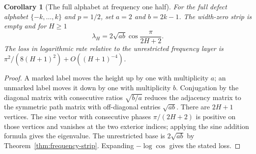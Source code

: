 \documentclass[11pt]{article}
\newtheorem{corollary}[theorem]{Corollary}
\theoremstyle{definition}
\theoremstyle{remark}
\begin{document}
\begin{corollary}[The full alphabet at frequency one half]\label{cor:half-strip}
For the full defect alphabet $\{-k,\ldots,k\}$ and $p=1/2$, set
$a=2$ and $b=2k-1$. The width-zero strip is empty and for $H\ge1$
\[
 \lambda_H=2\sqrt{ab}\cos\frac{\pi}{2H+2}.
\]
The loss in logarithmic rate relative to the unrestricted frequency
layer is $\pi^2/(8(H+1)^2)+O((H+1)^{-4})$.
\end{corollary}
\begin{proof}
A marked label moves the height up by one with multiplicity $a$;
an unmarked label moves it down by one with multiplicity $b$.
Conjugation by the diagonal matrix with consecutive ratios
$\sqrt{b/a}$ reduces the adjacency matrix to the symmetric path
matrix with off-diagonal entries $\sqrt{ab}$. There are $2H+1$
vertices. The sine vector with consecutive phases $\pi/(2H+2)$
is positive on those vertices and vanishes at the two exterior
indices; applying the sine addition formula gives the eigenvalue.
The unrestricted base is $2\sqrt{ab}$ by
Theorem~\ref{thm:frequency-strip}. Expanding $-\log\cos$ gives
the stated loss.
\end{proof}
\end{document}
